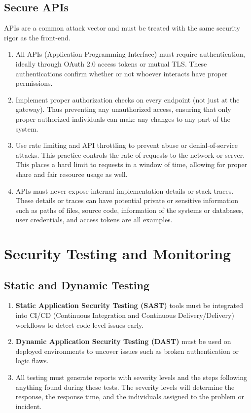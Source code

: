 \subsection{Secure APIs}
APIs are a common attack vector and must be treated with the same security rigor as the front-end.
\begin{enumerate}
    \item All APIs (Application Programming Interface) must require authentication, ideally through OAuth 2.0 access tokens or mutual TLS. These authentications confirm whether or not whoever interacts have proper permissions.
    \item Implement proper authorization checks on every endpoint (not just at the gateway). Thus preventing any unauthorized access, ensuring that only proper authorized individuals can make any changes to any part of the system.
    \item Use rate limiting and API throttling to prevent abuse or denial-of-service attacks. This practice controls the rate of requests to the network or server. This places a hard limit to requests in a window of time, allowing for proper share and fair resource usage as well.
    \item APIs must never expose internal implementation details or stack traces. These details or traces can have potential private or sensitive information such as paths of files, source code, information of the systems or databases, user credentials, and access tokens are all examples.
\end{enumerate}
\section{Security Testing and Monitoring}
\subsection{Static and Dynamic Testing}
\begin{enumerate}
    \item \textbf{Static Application Security Testing (SAST)} tools must be integrated into CI/CD  (Continuous Integration and Continuous Delivery/Delivery) workflows to detect code-level issues early.
    \item \textbf{Dynamic Application Security Testing (DAST)} must be used on deployed environments to uncover issues such as broken authentication or logic flaws.
    \item All testing must generate reports with severity levels and the steps following anything found during these tests. The severity levels will determine the response, the response time, and the individuals assigned to the problem or incident.
\end{enumerate}
